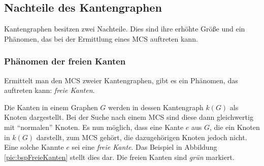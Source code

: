 \subsection{Nachteile des Kantengraphen}
Kantengraphen besitzen zwei Nachteile. Dies sind ihre erhöhte Größe 
und ein Phänomen, das bei der Ermittlung eines MCS auftreten kann.

\subsubsection{Phänomen der freien Kanten}
Ermittelt man den MCS zweier Kantengraphen, gibt es ein Phänomen, 
das auftreten kann: \emph{freie Kanten}.

Die Kanten in einem Graphen $G$ werden in dessen Kantengraph $k(G)$ 
als Knoten dargestellt. Bei der Suche nach einem MCS sind diese dann 
gleichwertig mit "`normalen"' Knoten. Es nun möglich, dass eine 
Kante $e$ aus $G$, die ein Knoten in $k(G)$ darstellt, zum MCS gehört, 
die dazugehörigen Knoten jedoch nicht. Eine solche Kannte $e$ sei 
eine \emph{freie Kante}. Das Beispiel in Abbildung \ref{pic:bspFreieKanten} 
stellt dies dar. Die freien Kanten sind \emph{grün} markiert.


